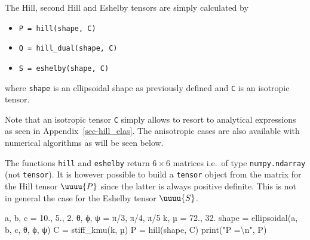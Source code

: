 \documentclass[
  letterpaper,
  DIV=11,
  numbers=noendperiod]{scrreprt}
\newenvironment{Shaded}{\begin{snugshade}}{\end{snugshade}}
\newcommand{\BuiltInTok}[1]{\textcolor[rgb]{0.00,0.23,0.31}{#1}}
\newcommand{\CharTok}[1]{\textcolor[rgb]{0.13,0.47,0.30}{#1}}
\newcommand{\DecValTok}[1]{\textcolor[rgb]{0.68,0.00,0.00}{#1}}
\newcommand{\FloatTok}[1]{\textcolor[rgb]{0.68,0.00,0.00}{#1}}
\newcommand{\NormalTok}[1]{\textcolor[rgb]{0.00,0.23,0.31}{#1}}
\newcommand{\OperatorTok}[1]{\textcolor[rgb]{0.37,0.37,0.37}{#1}}
\newcommand{\StringTok}[1]{\textcolor[rgb]{0.13,0.47,0.30}{#1}}
\providecommand{\tightlist}{%
  \setlength{\itemsep}{0pt}\setlength{\parskip}{0pt}}\usepackage{longtable,booktabs,array}
\begin{document}
The Hill, second Hill and Eshelby tensors are simply calculated by

\begin{itemize}
\tightlist
\item
  \texttt{P\ =\ hill(shape,\ C)}
\item
  \texttt{Q\ =\ hill\_dual(shape,\ C)}
\item
  \texttt{S\ =\ eshelby(shape,\ C)}
\end{itemize}

where \texttt{shape} is an ellipsoidal shape as previously defined and
\texttt{C} is an isotropic tensor.

Note that an isotropic tensor \texttt{C} simply allows to resort to
analytical expressions as seen in Appendix~\ref{sec-hill_elas}. The
anisotropic cases are also available with numerical algorithms as will
be seen below.

\begin{tcolorbox}[enhanced jigsaw, left=2mm, bottomrule=.15mm, colbacktitle=quarto-callout-warning-color!10!white, colback=white, colframe=quarto-callout-warning-color-frame, rightrule=.15mm, bottomtitle=1mm, toptitle=1mm, titlerule=0mm, title=\textcolor{quarto-callout-warning-color}{\faExclamationTriangle}\hspace{0.5em}{Warning}, toprule=.15mm, arc=.35mm, opacityback=0, opacitybacktitle=0.6, leftrule=.75mm, breakable, coltitle=black]

The functions \texttt{hill} and \texttt{eshelby} return \(6×6\) matrices
i.e.~of type \texttt{numpy.ndarray} (not \texttt{tensor}). It is however
possible to build a \texttt{tensor} object from the matrix for the Hill
tensor \(\uuuu{P}\) since the latter is always positive definite. This
is not in general the case for the Eshelby tensor \(\uuuu{S}\).

\end{tcolorbox}

\begin{Shaded}
\begin{Highlighting}[]
\NormalTok{a, b, c }\OperatorTok{=} \FloatTok{10.}\NormalTok{, }\FloatTok{5.}\NormalTok{, }\FloatTok{2.}
\NormalTok{θ, ϕ, ψ }\OperatorTok{=}\NormalTok{ π}\OperatorTok{/}\DecValTok{3}\NormalTok{, π}\OperatorTok{/}\DecValTok{4}\NormalTok{, π}\OperatorTok{/}\DecValTok{5}
\NormalTok{k, µ }\OperatorTok{=} \FloatTok{72.}\NormalTok{, }\FloatTok{32.} 
\NormalTok{shape }\OperatorTok{=}\NormalTok{ ellipsoidal(a, b, c, θ, ϕ, ψ)}
\NormalTok{C }\OperatorTok{=}\NormalTok{ stiff\_kmu(k, µ)}
\NormalTok{P }\OperatorTok{=}\NormalTok{ hill(shape, C)}
\BuiltInTok{print}\NormalTok{(}\StringTok{"P =}\CharTok{\textbackslash{}n}\StringTok{"}\NormalTok{, P)}
\end{Highlighting}
\end{Shaded}
\end{document}
